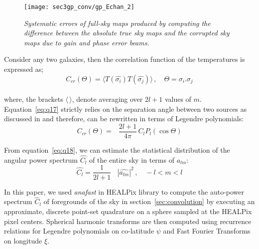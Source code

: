 \documentclass[fleqn,usenatbib]{mnras}
\begin{document}
 \begin{figure*}
\begin{minipage}[H]{\linewidth}
      \centering
      \texttt{[image: sec3gp\_conv/gp\_Echan\_2]}       
      \end{minipage} 
    \caption{\textit{Systematic errors of full-sky maps produced by computing the difference between the absolute true sky maps and the corrupted sky maps due to gain and phase error beams.}} \label{fig:fg11}
\end{figure*}

\noindent
Consider any two galaxies, then the correlation function of the temperatures is expressed as;
  \begin{equation}		\label{eq:q17}   
   C_{cr}(\Theta) = \langle T(\hat{\sigma_i})T(\hat{\sigma_j})\rangle \, , \quad \Theta = \sigma_{i}.\sigma_{j}   
  \end{equation}\\
%

\noindent
where, the brackets $\langle \, \rangle$, denote averaging over $2l+1$ values of $m$.\\
%

\noindent
Equation~\eqref{eq:q17} strictly relies on the separation angle between two sources as discussed in \cite[p. 78]{1997Schramm} and therefore, can be rewritten in terms of Legendre polynomials:
%
\begin{equation}  	 \label{eq:q18}
   C_{cr}(\Theta) = \mathop{\sum_{l\, = 0}}\, \frac{2l + 1}{4\pi}\,C_{l}P_{l}(\cos \Theta)  
  \end{equation}
  
\noindent
 From equation~\eqref{eq:q18}, we can estimate the statistical distribution of the angular power spectrum $\hat{C_l}$ of the entire sky in terms of $a_{lm}$:
 \begin{equation}  	\label{eq:q19}
  \hat{C_l} = \frac{1}{2l + 1}\, \mathop{\sum_{m}}\, |\hat{a_{lm}}|^{2} \, , \quad -l < m < l 	
\end{equation}
% 

\noindent
In this paper, we used \emph{anafast} in HEALPix library to compute the auto-power spectrum $\hat{C}_{l}$ of foregrounds of the sky in section~\ref{sec:convolution} by executing an approximate, discrete point-set quadrature on a sphere sampled at the HEALPix pixel centers. Spherical harmonic transforms are then computed using recurrence relations for Legendre polynomials on co-latitude $\psi$ and Fast Fourier Transforms on longitude $\xi$. 
\end{document}
